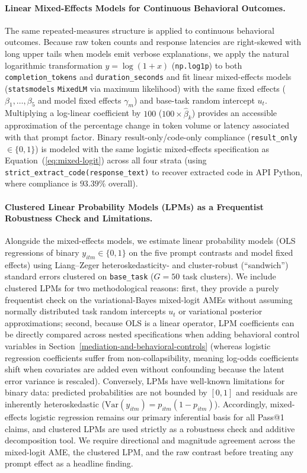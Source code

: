 \documentclass[a4paper,fleqn]{cas-sc}
\begin{document}
\paragraph{Linear Mixed-Effects Models for Continuous Behavioral Outcomes.}
The same repeated-measures structure is applied to continuous behavioral outcomes. Because raw token counts and response latencies are right-skewed with long upper tails when models emit verbose explanations, we apply the natural logarithmic transformation $y = \log(1 + x)$ (\texttt{np.log1p}) to both \texttt{completion\_tokens} and \texttt{duration\_seconds} and fit linear mixed-effects models (\texttt{statsmodels} \texttt{MixedLM} via maximum likelihood) with the same fixed effects ($\beta_1, \dots, \beta_5$ and model fixed effects $\gamma_m$) and base-task random intercept $u_t$. Multiplying a log-linear coefficient by $100$ ($100 \times \hat{\beta}_k$) provides an accessible approximation of the percentage change in token volume or latency associated with that prompt factor. Binary result-only/code-only compliance (\texttt{result\_only} $\in \{0, 1\}$) is modeled with the same logistic mixed-effects specification as Equation~(\ref{eq:mixed-logit}) across all four strata (using \texttt{strict\_extract\_code(response\_text)} to recover extracted code in API Python, where compliance is $93.39\%$ overall).

\paragraph{Clustered Linear Probability Models (LPMs) as a Frequentist Robustness Check and Limitations.}
Alongside the mixed-effects models, we estimate linear probability models (OLS regressions of binary $y_{itm} \in \{0, 1\}$ on the five prompt contrasts and model fixed effects) using Liang--Zeger heteroskedasticity- and cluster-robust (``sandwich'') standard errors clustered on \texttt{base\_task} ($G = 50$ task clusters). We include clustered LPMs for two methodological reasons: first, they provide a purely frequentist check on the variational-Bayes mixed-logit AMEs without assuming normally distributed task random intercepts $u_t$ or variational posterior approximations; second, because OLS is a linear operator, LPM coefficients can be directly compared across nested specifications when adding behavioral control variables in Section~\ref{mediation-and-behavioral-controls} (whereas logistic regression coefficients suffer from non-collapsibility, meaning log-odds coefficients shift when covariates are added even without confounding because the latent error variance is rescaled). Conversely, LPMs have well-known limitations for binary data: predicted probabilities are not bounded by $[0, 1]$ and residuals are inherently heteroskedastic ($\text{Var}(y_{itm}) = p_{itm}(1 - p_{itm})$). Accordingly, mixed-effects logistic regression remains our primary inferential basis for all Pass@1 claims, and clustered LPMs are used strictly as a robustness check and additive decomposition tool. We require directional and magnitude agreement across the mixed-logit AME, the clustered LPM, and the raw contrast before treating any prompt effect as a headline finding.
\end{document}
